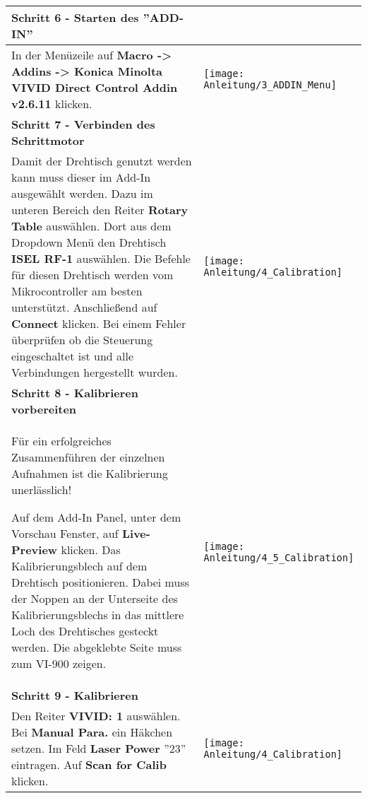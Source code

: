 \begin{longtable}{|>{\RaggedRight}m{5cm}|m{8cm}|}
\multicolumn{2}{|l|}%
{{\textbf{Schritt 6 - Starten des ''ADD-IN''}}}
\\ \hline
In der Menüzeile auf 
\textbf{Macro -> Addins -> Konica Minolta VIVID Direct Control Addin v2.6.11}
klicken.
& 
\texttt{[image: Anleitung/3\_ADDIN\_Menu]}
\\ \hline  

\pagebreak

\multicolumn{2}{|l|}%
{{\textbf{Schritt 7 - Verbinden des Schrittmotor}}}
\\ \hline
Damit der Drehtisch genutzt werden kann muss dieser im Add-In ausgewählt werden. Dazu im unteren Bereich den Reiter \textbf{Rotary Table} auswählen. Dort aus dem Dropdown Menü den Drehtisch \textbf{ISEL RF-1} auswählen. Die Befehle für diesen Drehtisch werden vom Mikrocontroller am besten unterstützt.
Anschließend auf \textbf{Connect} klicken.\linebreak
Bei einem Fehler überprüfen ob die Steuerung eingeschaltet ist und alle Verbindungen hergestellt wurden.
& 
\texttt{[image: Anleitung/4\_Calibration]}
\\ \hline  

\multicolumn{2}{|l|}%
{{\textbf{Schritt 8 - Kalibrieren vorbereiten}}}
\\ \hline
\begin{TippS}Für ein erfolgreiches Zusammenführen der einzelnen Aufnahmen ist die Kalibrierung unerlässlich!\end{TippS}
Auf dem Add-In Panel, unter dem Vorschau Fenster, auf \textbf{Live-Preview} klicken. \linebreak
Das Kalibrierungsblech auf dem Drehtisch positionieren.  \linebreak
Dabei muss der Noppen an der Unterseite des Kalibrierungsblechs in das mittlere Loch des Drehtisches gesteckt werden. Die abgeklebte Seite muss zum VI-900 zeigen.
& 
\texttt{[image: Anleitung/4\_5\_Calibration]}
\\ \hline  

\pagebreak

\multicolumn{2}{|l|}%
{{\textbf{Schritt 9 - Kalibrieren}}}
\\ \hline
Den Reiter \textbf{VIVID: 1} auswählen.\linebreak
Bei \textbf{Manual Para.} ein Häkchen setzen.\linebreak
Im Feld \textbf{Laser Power} ''23'' eintragen.\linebreak
Auf \textbf{Scan for Calib} klicken.
& 
\texttt{[image: Anleitung/4\_Calibration]}
\\ \hline  


\end{longtable}
